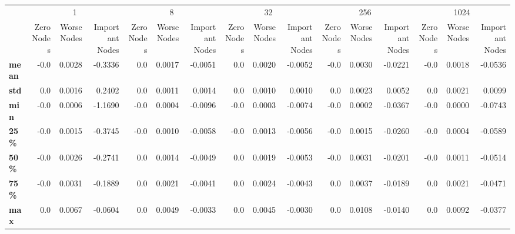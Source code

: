 \begin{tabular}{lrrrrrrrrrrrrrrr}
\toprule
{} & \multicolumn{3}{c}{1} & \multicolumn{3}{c}{8} & \multicolumn{3}{c}{32} & \multicolumn{3}{c}{256} & \multicolumn{3}{c}{1024} \\
{} & Zero Nodes & Worse Nodes & Important Nodes & Zero Nodes & Worse Nodes & Important Nodes & Zero Nodes & Worse Nodes & Important Nodes & Zero Nodes & Worse Nodes & Important Nodes & Zero Nodes & Worse Nodes & Important Nodes \\
\midrule
\textbf{mean} &       -0.0 &      0.0028 &         -0.3336 &        0.0 &      0.0017 &         -0.0051 &        0.0 &      0.0020 &         -0.0052 &       -0.0 &      0.0030 &         -0.0221 &       -0.0 &      0.0018 &         -0.0536 \\
\textbf{std } &        0.0 &      0.0016 &          0.2402 &        0.0 &      0.0011 &          0.0014 &        0.0 &      0.0010 &          0.0010 &        0.0 &      0.0023 &          0.0052 &        0.0 &      0.0021 &          0.0099 \\
\textbf{min } &       -0.0 &      0.0006 &         -1.1690 &       -0.0 &      0.0004 &         -0.0096 &       -0.0 &      0.0003 &         -0.0074 &       -0.0 &      0.0002 &         -0.0367 &       -0.0 &      0.0000 &         -0.0743 \\
\textbf{25\% } &       -0.0 &      0.0015 &         -0.3745 &       -0.0 &      0.0010 &         -0.0058 &       -0.0 &      0.0013 &         -0.0056 &       -0.0 &      0.0015 &         -0.0260 &       -0.0 &      0.0004 &         -0.0589 \\
\textbf{50\% } &       -0.0 &      0.0026 &         -0.2741 &        0.0 &      0.0014 &         -0.0049 &        0.0 &      0.0019 &         -0.0053 &       -0.0 &      0.0031 &         -0.0201 &       -0.0 &      0.0011 &         -0.0514 \\
\textbf{75\% } &       -0.0 &      0.0031 &         -0.1889 &        0.0 &      0.0021 &         -0.0041 &        0.0 &      0.0024 &         -0.0043 &        0.0 &      0.0037 &         -0.0189 &        0.0 &      0.0021 &         -0.0471 \\
\textbf{max } &        0.0 &      0.0067 &         -0.0604 &        0.0 &      0.0049 &         -0.0033 &        0.0 &      0.0045 &         -0.0030 &        0.0 &      0.0108 &         -0.0140 &        0.0 &      0.0092 &         -0.0377 \\
\bottomrule
\end{tabular}
